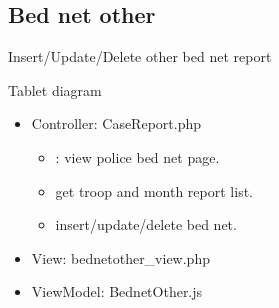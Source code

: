 \documentclass[letterpaper,10pt,english,openany,oneside]{sphinxmanual}
\begin{document}
\subsection{Bed net other}
\label{\detokenize{module/module:bed-net-other}}
\sphinxAtStartPar
Insert/Update/Delete other bed net report

\sphinxAtStartPar
Tablet diagram

\begin{sphinxVerbatim}[commandchars=\\\{\}]
                   
  
                   
\end{sphinxVerbatim}
\begin{itemize}
\item {} 
\sphinxAtStartPar
Controller: CaseReport.php
\begin{itemize}
\item {} 
\sphinxAtStartPar
{} : view police bed net page.

\item {} 
\sphinxAtStartPar
{} get troop and month report list.

\item {} 
\sphinxAtStartPar
{} insert/update/delete bed net.

\end{itemize}

\end{itemize}

\begin{sphinxVerbatim}[commandchars=\\\{\}]
     
   
      
   
 
\end{sphinxVerbatim}
\begin{itemize}
\item {} 
\sphinxAtStartPar
View: bednetother\_view.php

\item {} 
\sphinxAtStartPar
ViewModel: BednetOther.js

\end{itemize}
\end{document}
